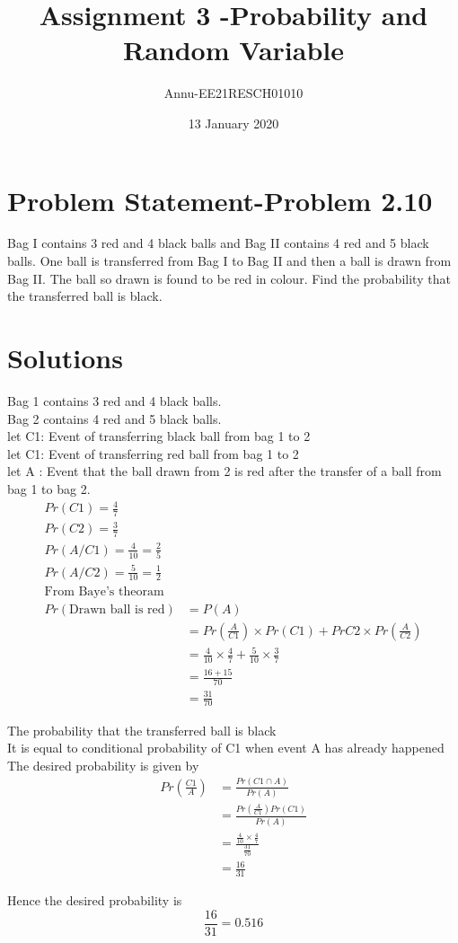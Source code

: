 \documentclass[journel,12pt,twocoloums]{IEEEtran}
\title{Assignment 3 -Probability and Random Variable}
\author{Annu-EE21RESCH01010}
\date{13 January 2020}
\begin{document}
 \maketitle
 \section{Problem Statement-Problem 2.10}
Bag I contains 3 red and 4 black balls and
Bag II contains 4 red and 5 black balls. One
ball is transferred from Bag I to Bag II and
then a ball is drawn from Bag II. The ball
so drawn is found to be red in colour. Find
the probability that the transferred ball is black.
\section{Solutions}
Bag 1 contains 3 red and 4 black balls.\\
Bag 2 contains 4 red and 5 black balls.\\

let  C1: Event of transferring black ball from bag 1 to 2\\
let  C1: Event of transferring red ball from bag 1 to 2\\
let A : Event that the ball drawn from 2 is red after the transfer of a ball from bag 1 to bag 2.\\
\begin{align*}
Pr(C1)= \frac{4}{7}\\
Pr(C2)=\frac{3}{7}\\
Pr(A/C1)=\frac{4}{10}=\frac{2}{5}\\
Pr(A/C2)=\frac{5}{10}=\frac{1}{2}\\
\text{From Baye's theoram} \\
Pr(\text{Drawn ball is red})&=P(A)\\
                     &=Pr(\frac{A}{C1})\times   Pr(C1)+Pr{C2}\times Pr(\frac{A}{C2})\\
                     &=\frac{4}{10}\times \frac{4}{7}+\frac{5}{10}\times \frac{3}{7}\\
                     &=\frac{16+15}{70}\\
                     &=\frac{31}{70}
\end{align*}


The probability that the transferred ball is black\\
It is equal to conditional probability of C1 when event A has already happened\\
The desired probability is given by\\
\begin{align*}
Pr(\frac{C1}{A})&=\frac{Pr(C1 \cap A)}{Pr(A)}\\
        &=\frac{Pr(\frac{A}{C1})Pr(C1)}{Pr(A)}\\
        &=\frac{\frac{4}{10} \times \frac{4}{7}}{\frac{31}{70}}\\
        &=\frac{16}{31}
\end{align*}

Hence the desired probability is $$\frac{16}{31}=0.516$$
            
\end{document}
